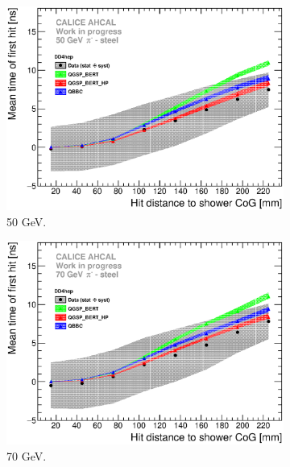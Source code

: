 \begin{figure}[htbp!]
\begin{subfigure}[t]{0.49\textwidth}
    \centering
    \includegraphics[width=1\textwidth]{../Thesis_Plots/Timing/Pions/Plots/ComparisonToSim/Time_Radius_50GeV_SSF_DD4hep.eps}
    \caption{50 GeV.} \label{fig:Radius_SSF_SimData_50GeV_DD4hep}
  \end{subfigure}
  \hfill
  \begin{subfigure}[t]{0.49\textwidth}
    \centering
    \includegraphics[width=1\textwidth]{../Thesis_Plots/Timing/Pions/Plots/ComparisonToSim/Time_Radius_70GeV_SSF_DD4hep.eps}
    \caption{70 GeV.} \label{fig:Radius_SSF_SimData_70GeV_DD4hep}
  \end{subfigure}
  \hfill
  \begin{subfigure}[t]{0.49\textwidth}
    \centering

\end{subfigure}
\end{figure}
